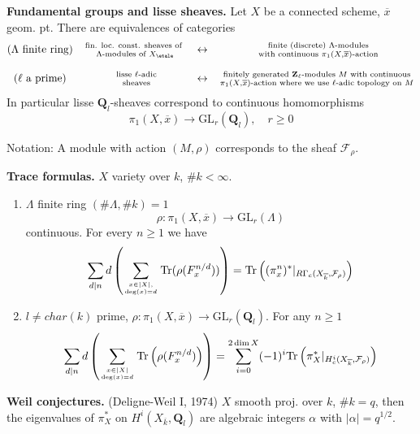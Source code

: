 \medskip\noindent
{\bf Fundamental groups and lisse sheaves.}
Let $X$ be a connected scheme, $\overline{x}$ geom. pt. There are
equivalences of categories
$$
\begin{matrix}
(\Lambda\text{ finite ring}) &
\text{fin. loc. const. sheaves of }
\atop \Lambda\text{-modules of }X_\etale & \leftrightarrow &
\text{ finite (discrete) }\Lambda\text{-modules}
\atop \text{ with continuous }\pi_1(X, \overline{x})\text{-action}\\
\\
(\ell\text{ a prime}) & \text{ lisse }\ell\text{-adic} \atop \text{ sheaves} &
\leftrightarrow &
\text{finitely generated }\mathbf{Z}_\ell
\text{-modules }M\text{ with continuous}
\atop \pi_1(X, \overline{x})\text{-action where we use }
\ell\text{-adic topology on }M
\end{matrix}
$$
In particular lisse $\mathbf{Q}_l$-sheaves correspond to continuous
homomorphisms
$$
\pi_1(X, \overline{x}) \to \text{GL}_r(\mathbf{Q}_l), \quad r\geq 0
$$

\noindent
Notation: A module with action $(M, \rho)$ corresponds to the sheaf
$\mathcal{F}_\rho$.

\medskip\noindent
{\bf Trace formulas.} $X$ variety over $k$, $\# k < \infty$.
\begin{enumerate}
\item $\Lambda$ finite ring $(\# \Lambda, \# k)=1$
$$
\rho : \pi_1(X, \overline{x})\to \text{GL}_r(\Lambda)
$$
continuous. For every $n\geq 1$ we have
$$
\sum_{d|n}d\left(
\sum_{x\in |X|, \atop \deg(x)=d}
\text{Tr}(\rho(F_x^{n/d}))\right) =
\text{Tr}\left(
(\pi_x^n)^* |_{R\Gamma_c(X_{\overline{k}}, \mathcal{F}_\rho)}\right)
$$
\item $l\neq char(k)$ prime, $\rho : \pi_1(X, \overline{x})\to
\text{GL}_r(\mathbf{Q}_l)$. For any $n\geq 1$
$$
\sum_{d|n} d\left(
\sum_{x\in |X| \atop \deg(x)=d}
\text{Tr}
\left(
\rho(F_x^{n/d})
\right)
\right) =
\sum_{i = 0}^{2\dim X}
(-1)^i
\text{Tr}\left(
\pi_X^* |_{H_c^i(X_{\overline{k}}, \mathcal{F}_\rho)}\right)
$$
\end{enumerate}

\noindent
{\bf Weil conjectures.} (Deligne-Weil I, 1974) $X$ smooth proj. over $k$,
$\# k = q$, then the eigenvalues of $\pi_X^*$ on $H^i(X_{\overline{k}},
\mathbf{Q}_l)$ are algebraic integers $\alpha$ with $|\alpha|=q^{1/2}$.

